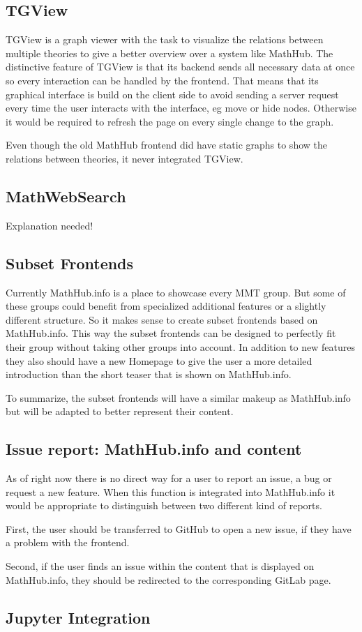 \documentclass[11pt,a4paper]{article}
\begin{document}
\subsection{TGView} 
TGView is a graph viewer with the task to visualize the relations between multiple theories to give a better overview over a system like MathHub.
The distinctive feature of TGView is that its backend sends all necessary data at once so every interaction can be handled by the frontend.
That means that its graphical interface is build on the client side to avoid sending a server request every time the user interacts with the interface, eg move or hide nodes.
Otherwise it would be required to refresh the page on every single change to the graph. 	\cite{tgview}
 
Even though the old MathHub frontend did have static graphs to show the relations between theories, it never integrated TGView.
 
\subsection{MathWebSearch}
Explanation needed!

\subsection{Subset Frontends}
Currently MathHub.info is a place to showcase every MMT group.
But some of these groups could benefit from specialized additional features or a slightly different structure.
So it makes sense to create subset frontends based on MathHub.info.
This way the subset frontends can be designed to perfectly fit their group without taking other groups into account.
In addition to new features they also should have a new Homepage to give the user a more detailed introduction than the short teaser that is shown on MathHub.info.

To summarize, the subset frontends will have a similar makeup as MathHub.info but will be adapted to better represent their content.

\subsection{Issue report: MathHub.info and content}
As of right now there is no direct way for a user to report an issue, a bug or request a new feature.
When this function is integrated into MathHub.info it would be appropriate to distinguish between two different kind of reports.

First, the user should be transferred to GitHub to open a new issue, if they have a problem with the frontend.

Second, if the user finds an issue within the content that is displayed on MathHub.info, they should be redirected to the corresponding GitLab page. 
\subsection{Jupyter Integration}

\printbibliography
{}
\end{document}

